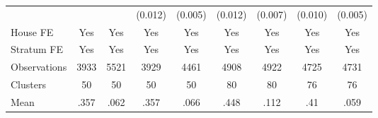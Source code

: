 {\begin{tabular}{l*{8}{c}}
                &                  &                  &  (0.012)         &  (0.005)         &  (0.012)         &  (0.007)         &  (0.010)         &  (0.005)         \\
House FE        &      Yes         &      Yes         &      Yes         &      Yes         &      Yes         &      Yes         &      Yes         &      Yes         \\
Stratum FE      &      Yes         &      Yes         &      Yes         &      Yes         &      Yes         &      Yes         &      Yes         &      Yes         \\
\midrule
Observations    &     3933         &     5521         &     3929         &     4461         &     4908         &     4922         &     4725         &     4731         \\
Clusters        &       50         &       50         &       50         &       50         &       80         &       80         &       76         &       76         \\
Mean            &     .357         &     .062         &     .357         &     .066         &     .448         &     .112         &      .41         &     .059         \\
\bottomrule
\end{tabular}
}
